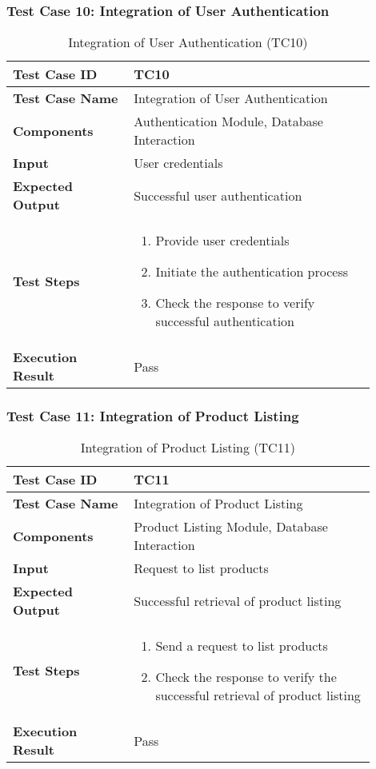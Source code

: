 \begin{table}[h]
	\subsubsection{Test Case 10: Integration of User Authentication}
	\centering
	\caption{Integration of User Authentication (TC10)}
	\begin{tabular}{|p{0.3\linewidth}|p{0.6\linewidth}|}
		\hline
		\textbf{Test Case ID} & TC10 \\
		\hline
		\textbf{Test Case Name} & Integration of User Authentication \\
		\hline
		\textbf{Components} & Authentication Module, Database Interaction \\
		\hline
		\textbf{Input} & User credentials \\
		\hline
		\textbf{Expected Output} & Successful user authentication \\
		\hline
		\textbf{Test Steps} & 
		\begin{enumerate}
			\item Provide user credentials
			\item Initiate the authentication process
			\item Check the response to verify successful authentication
		\end{enumerate} \\
		\hline
		\textbf{Execution Result} & Pass \\
		\hline
	\end{tabular}
\end{table}

\begin{table}[h]
	\subsubsection{Test Case 11: Integration of Product Listing}
	\centering
	\caption{Integration of Product Listing (TC11)}
	\begin{tabular}{|p{0.3\linewidth}|p{0.6\linewidth}|}
		\hline
		\textbf{Test Case ID} & TC11 \\
		\hline
		\textbf{Test Case Name} & Integration of Product Listing \\
		\hline
		\textbf{Components} & Product Listing Module, Database Interaction \\
		\hline
		\textbf{Input} & Request to list products \\
		\hline
		\textbf{Expected Output} & Successful retrieval of product listing \\
		\hline
		\textbf{Test Steps} & 
		\begin{enumerate}
			\item Send a request to list products
			\item Check the response to verify the successful retrieval of product listing
		\end{enumerate} \\
		\hline
		\textbf{Execution Result} & Pass \\
		\hline
	\end{tabular}
\end{table}

